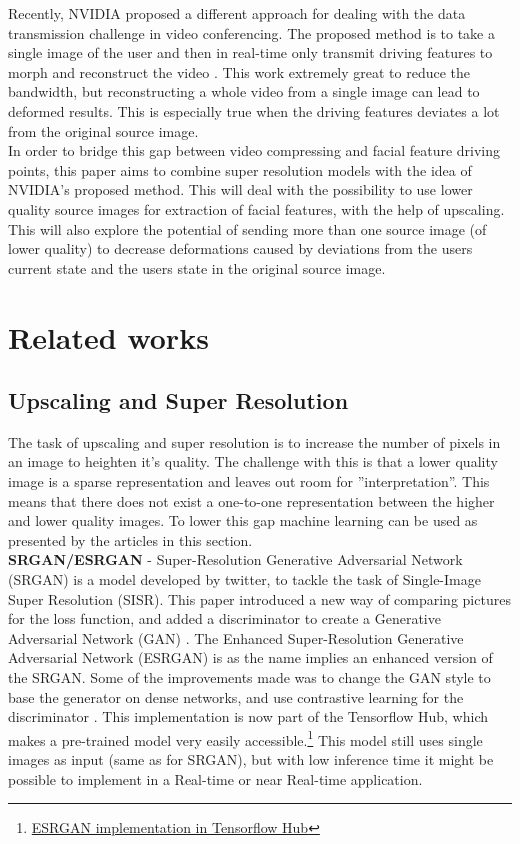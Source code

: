 \documentclass[10pt,twocolumn,letterpaper]{article}
\begin{document}
Recently, NVIDIA proposed a different approach for dealing with the data transmission challenge in video conferencing. The proposed method is to take a single image of the user and then in real-time only transmit driving features to morph and reconstruct the video \cite{Nvidia}. This work extremely great to reduce the bandwidth, but reconstructing a whole video from a single image can lead to deformed results. This is especially true when the driving features deviates a lot from the original source image.\\

In order to bridge this gap between video compressing and facial feature driving points, this paper aims to combine super resolution models with the idea of NVIDIA's proposed method. This will deal with the possibility to use lower quality source images for extraction of facial features, with the help of upscaling. This will also explore the potential of sending more than one source image (of lower quality) to decrease deformations caused by deviations from the users current state and the users state in the original source image.

\section{Related works}

\subsection{Upscaling and Super Resolution}
The task of upscaling and super resolution is to increase the number of pixels in an image to heighten it's quality. The challenge with this is that a lower quality image is a sparse representation and leaves out room for ''interpretation''. This means that there does not exist a one-to-one representation between the higher and lower quality images. To lower this gap machine learning can be used as presented by the articles in this section.\\

\textbf{SRGAN/ESRGAN} - Super-Resolution Generative Adversarial Network (SRGAN) is a model developed by twitter, to tackle the task of Single-Image Super Resolution (SISR). This paper introduced a new way of comparing pictures for the loss function, and added a discriminator to create a Generative Adversarial Network (GAN) \cite{SRGAN}. The Enhanced Super-Resolution Generative Adversarial Network (ESRGAN) is as the name implies an enhanced version of the SRGAN. Some of the improvements made was to change the GAN style to base the generator on dense networks, and use contrastive learning for the discriminator \cite{ESRGAN}. This implementation is now part of the Tensorflow Hub, which makes a pre-trained model very easily accessible.\footnote{\href{https://www.tensorflow.org/hub/tutorials/image_enhancing}{ESRGAN implementation in Tensorflow Hub}} This model still uses single images as input (same as for SRGAN), but with low inference time it might be possible to implement in a Real-time or near Real-time application. \\
\end{document}
